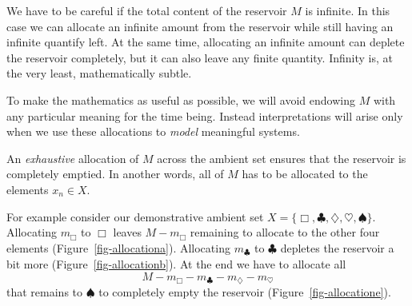 \documentclass[
  letterpaper,
  DIV=11,
  numbers=noendperiod]{scrartcl}
\begin{document}
We have to be careful if the total content of the reservoir \(M\) is
infinite. In this case we can allocate an infinite amount from the
reservoir while still having an infinite quantify left. At the same
time, allocating an infinite amount can deplete the reservoir
completely, but it can also leave any finite quantity. Infinity is, at
the very least, mathematically subtle.

To make the mathematics as useful as possible, we will avoid endowing
\(M\) with any particular meaning for the time being. Instead
interpretations will arise only when we use these allocations to
\emph{model} meaningful systems.

An \emph{exhaustive} allocation of \(M\) across the ambient set ensures
that the reservoir is completely emptied. In another words, all of \(M\)
has to be allocated to the elements \(x_{n} \in X\).

For example consider our demonstrative ambient set
\(X = \{\Box, \clubsuit, \diamondsuit, \heartsuit, \spadesuit \}\).
Allocating \(m_\Box\) to \(\Box\) leaves \(M - m_\Box\) remaining to
allocate to the other four elements (Figure~\ref{fig-allocationa}).
Allocating \(m_\clubsuit\) to \(\clubsuit\) depletes the reservoir a bit
more (Figure~\ref{fig-allocationb}). At the end we have to allocate all
\[
M - m_{\Box} - m_{\clubsuit} - m_{\diamondsuit} - m_{\heartsuit}
\] that remains to \(\spadesuit\) to completely empty the reservoir
(Figure~\ref{fig-allocatione}).
\end{document}
